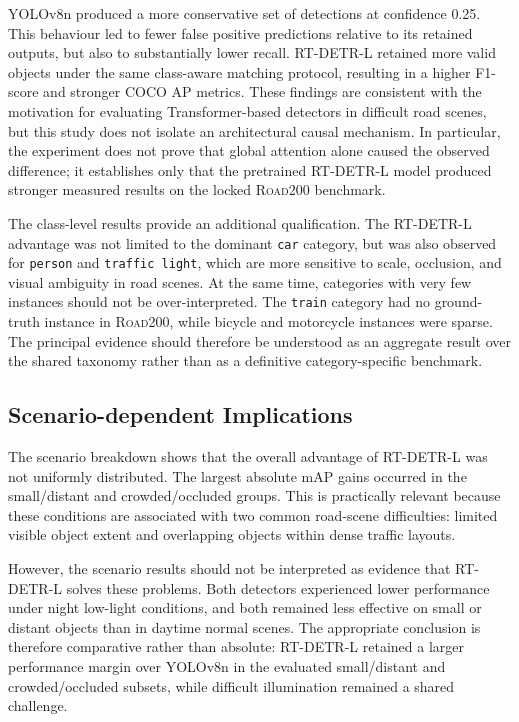 \documentclass[runningheads]{llncs}
\begin{document}
YOLOv8n produced a more conservative set of detections at confidence 0.25. This behaviour led to fewer false positive predictions relative to its retained outputs, but also to substantially lower recall. RT-DETR-L retained more valid objects under the same class-aware matching protocol, resulting in a higher F1-score and stronger COCO AP metrics. These findings are consistent with the motivation for evaluating Transformer-based detectors in difficult road scenes, but this study does not isolate an architectural causal mechanism. In particular, the experiment does not prove that global attention alone caused the observed difference; it establishes only that the pretrained RT-DETR-L model produced stronger measured results on the locked \textsc{Road200} benchmark.

The class-level results provide an additional qualification. The RT-DETR-L advantage was not limited to the dominant \texttt{car} category, but was also observed for \texttt{person} and \texttt{traffic light}, which are more sensitive to scale, occlusion, and visual ambiguity in road scenes. At the same time, categories with very few instances should not be over-interpreted. The \texttt{train} category had no ground-truth instance in \textsc{Road200}, while bicycle and motorcycle instances were sparse. The principal evidence should therefore be understood as an aggregate result over the shared taxonomy rather than as a definitive category-specific benchmark.

\subsection{Scenario-dependent Implications}

The scenario breakdown shows that the overall advantage of RT-DETR-L was not uniformly distributed. The largest absolute mAP gains occurred in the small/distant and crowded/occluded groups. This is practically relevant because these conditions are associated with two common road-scene difficulties: limited visible object extent and overlapping objects within dense traffic layouts.

However, the scenario results should not be interpreted as evidence that RT-DETR-L solves these problems. Both detectors experienced lower performance under night low-light conditions, and both remained less effective on small or distant objects than in daytime normal scenes. The appropriate conclusion is therefore comparative rather than absolute: RT-DETR-L retained a larger performance margin over YOLOv8n in the evaluated small/distant and crowded/occluded subsets, while difficult illumination remained a shared challenge.
\end{document}
